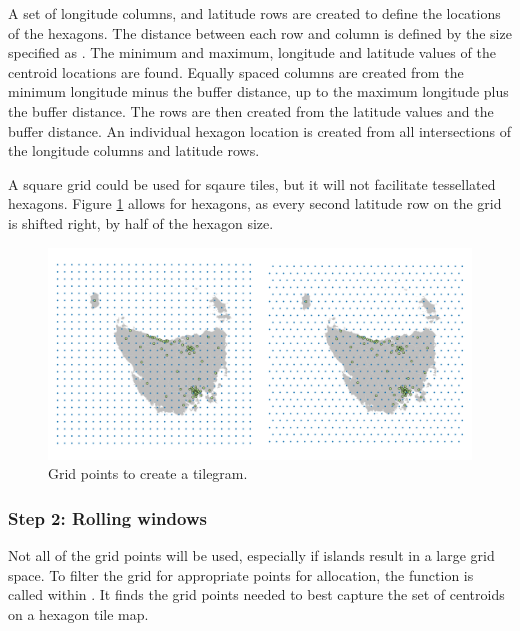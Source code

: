 \documentclass[
]{jss}
\begin{document}
A set of longitude columns, and latitude rows are created to define the
locations of the hexagons. The distance between each row and column is
defined by the size specified as . The minimum and
maximum, longitude and latitude values of the centroid locations are
found. Equally spaced columns are created from the minimum longitude
minus the buffer distance, up to the maximum longitude plus the buffer
distance. The rows are then created from the latitude values and the
buffer distance. An individual hexagon location is created from all
intersections of the longitude columns and latitude rows.

A square grid could be used for sqaure tiles, but it will not facilitate
tessellated hexagons. Figure \ref{fig:grid2} allows for hexagons, as
every second latitude row on the grid is shifted right, by half of the
hexagon size.

\begin{CodeChunk}
\begin{figure}

{\centering \includegraphics[width=1\linewidth]{figures/2grid} 

}

\caption[Grid points to create a tilegram]{Grid points to create a tilegram.}\label{fig:grid2}
\end{figure}
\end{CodeChunk}

\hypertarget{step-2-rolling-windows}{%
\subsubsection{Step 2: Rolling windows}\label{step-2-rolling-windows}}

Not all of the grid points will be used, especially if islands result in
a large grid space. To filter the grid for appropriate points for
allocation, the  function is called within
. It finds the grid points needed to best capture the
set of centroids on a hexagon tile map.
\end{document}
